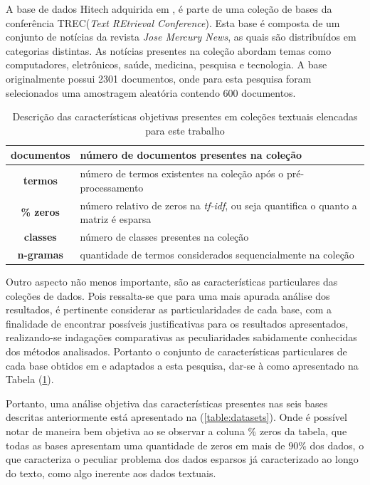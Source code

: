 A base de dados Hitech adquirida em , é parte de uma coleção de bases da 
conferência TREC({\it Text REtrieval Conference\/})\footnotemark. 
Esta base é composta de um conjunto de notícias da revista {\it Jose Mercury News\/}\footnotemark, 
as quais são distribuídos em categorias distintas. As notícias presentes na coleção
abordam temas como computadores, eletrônicos, saúde, medicina, pesquisa e tecnologia. 
A base originalmente possui 2301
documentos, onde para esta pesquisa foram selecionados uma amostragem aleatória contendo 600
documentos. 

\begin{table}[!htp]
  \centering
  \begin{tabular}{ |c|p{11cm}|}
    \hline
    {\bf documentos} & número de documentos presentes na coleção \\
    \hline
    {\bf termos} & número de termos existentes na coleção após o pré-processamento \\
    \hline
    {\bf \% zeros} & número relativo de zeros na {\it tf-idf\/}, ou seja quantifica o quanto a
matriz é esparsa \\
    \hline
    {\bf classes} & número de classes presentes na coleção \\
    \hline
    {\bf n-gramas} & quantidade de termos considerados sequencialmente na coleção \\
    \hline
  \end{tabular}
  \caption{Descrição das características objetivas presentes em coleções textuais elencadas para
este trabalho}
  \label{table:datainfo}
\end{table}

Outro aspecto não menos importante, são as características particulares das coleções de dados. Pois
ressalta-se que para uma mais apurada análise dos resultados, é pertinente considerar as
particularidades de cada base, com a finalidade de encontrar possíveis justificativas para os
resultados apresentados, realizando-se indagações comparativas as peculiaridades sabidamente
conhecidas dos métodos analisados. Portanto o conjunto de características particulares de cada base
obtidos em  e adaptados a esta pesquisa, dar-se à como apresentado
na Tabela (\ref{table:datainfo}). 


Portanto, uma análise objetiva das características presentes nas seis bases descritas anteriormente 
está apresentado na (\ref{table:datasets}). Onde é possível notar de maneira bem 
objetiva ao se observar
a coluna \% zeros da tabela, que todas as bases apresentam uma quantidade de zeros em mais de $90\%$
dos dados, o que caracteriza o peculiar problema dos dados esparsos já caracterizado ao longo do
texto, como algo inerente aos dados textuais.


